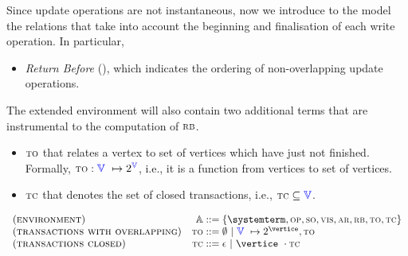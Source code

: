 
%
%
%
%
%
%

Since update operations are not instantaneous, now we introduce to the model the relations that take into account the 
beginning and finalisation of each write operation. In particular,

\begin{itemize}
   \item{\em Return Before} (\rb), which indicates the ordering of non-overlapping update operations. 
\end{itemize}

The extended environment will also contain two additional terms that are instrumental to the 
computation of $\textsc{\scriptsize{RB}}$. 

\begin{itemize}
	\item $\textsc{\scriptsize{TO}}$ that relates a vertex to set of vertices which have just not finished. Formally,  
	$\textsc{\scriptsize{TO}} :\textcolor{blue}{\mathbb{V}}\ \mapsto 2^{\textcolor{blue}{\mathbb{V}}}$, i.e., it is a function from vertices to set of vertices.
	\item $\textsc{\scriptsize{TC}}$ that denotes the set of closed transactions, i.e., $\textsc{\scriptsize{TC}}\subseteq \textcolor{blue}{\mathbb{V}}$.
\end{itemize}

\[
    \begin{array}{l@{\quad}r@{\;::=\;}l}
			 (\textsc{environment}) & \environmentterm &  \environmenttran{\systemterm}{\op}{\so}{\vis}{\arb}{\rb}{\tx}{\tc} \\
			 (\textsc{transactions with overlapping}) & \tx &  \emptyset  \ | \ \verticesets\ \mapsto 2^{\vertice},\tx   \\
			 (\textsc{transactions closed}) & \tc &  \epsilon  \ | \ \vertice\ \cdot \tc 
	   \end{array}
\]


